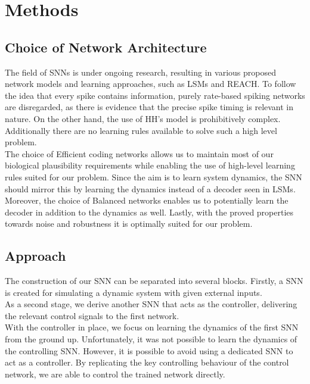 \chapter{Methods}\label{c:method}


\section{Choice of Network Architecture}

The field of \acp{SNN} is under ongoing research, resulting in various proposed network models and learning approaches, such as \acp{LSM} and REACH\cite{dewolf_spiking_2016}. To follow the idea that every spike contains information, purely rate-based spiking networks are disregarded, as there is evidence that the precise spike timing is relevant in nature\cite{brette_philosophy_2015,putney_precise_2019}. On the other hand, the use of \ac{HH}'s model is prohibitively complex. Additionally there are no learning rules available to solve such a high level problem.\\

The choice of Efficient coding networks allows us to maintain most of our biological plausibility requirements while enabling the use of high-level learning rules suited for our problem. Since the aim is to learn system dynamics, the \ac{SNN} should mirror this by learning the dynamics instead of a decoder seen in \acp{LSM}. Moreover, the choice of Balanced networks enables us to potentially learn the decoder in addition to the dynamics as well. Lastly, with the proved properties towards noise and robustness it is optimally suited for our problem.
\section{Approach}
The construction of our \ac{SNN} can be separated into several blocks. Firstly, a \ac{SNN} is created for simulating a dynamic system with given external inputs.\\
As a second stage, we derive another \ac{SNN} that acts as the controller, delivering the relevant control signals to the first network.\\
With the controller in place, we focus on learning the dynamics of the first \ac{SNN} from the ground up. Unfortunately, it was not possible to learn the dynamics of the controlling \ac{SNN}. However, it is possible to avoid using a dedicated \ac{SNN} to act as a controller. By replicating the key controlling behaviour of the control network, we are able to control the trained network directly.\\
